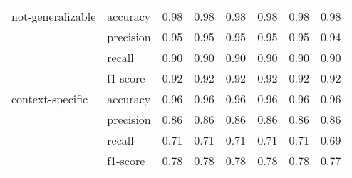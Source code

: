 \begin{tabular}{llrrrrrr}
not-generalizable & accuracy &            0.98 &            0.98 &            0.98 &            0.98 &            0.98 &             0.98 \\
                 & precision &            0.95 &            0.95 &            0.95 &            0.95 &            0.95 &             0.94 \\
                 & recall &            0.90 &            0.90 &            0.90 &            0.90 &            0.90 &             0.90 \\
                 & f1-score &            0.92 &            0.92 &            0.92 &            0.92 &            0.92 &             0.92 \\
context-specific & accuracy &            0.96 &            0.96 &            0.96 &            0.96 &            0.96 &             0.96 \\
                 & precision &            0.86 &            0.86 &            0.86 &            0.86 &            0.86 &             0.86 \\
                 & recall &            0.71 &            0.71 &            0.71 &            0.71 &            0.71 &             0.69 \\
                 & f1-score &            0.78 &            0.78 &            0.78 &            0.78 &            0.78 &             0.77 \\
\bottomrule
\end{tabular}

